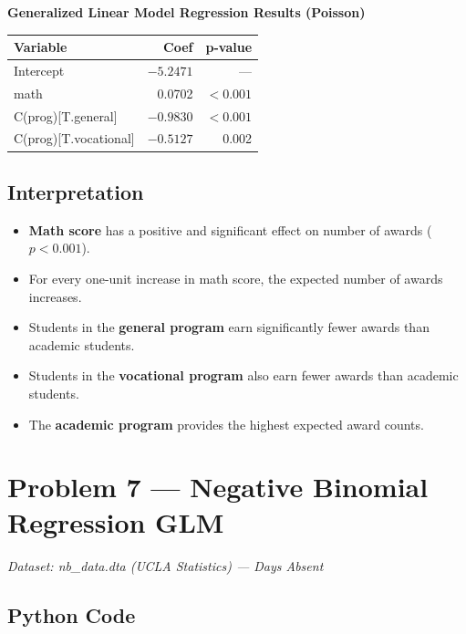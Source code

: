 \documentclass[12pt,a4paper]{article}
\begin{document}
\begin{outputbox}
\textbf{Generalized Linear Model Regression Results (Poisson)}
\begin{center}
\begin{tabular}{lrr}
\toprule
Variable                & Coef    & p-value  \\
\midrule
Intercept               & $-5.2471$ & ---    \\
math                    & 0.0702  & $<0.001$ \\
C(prog)[T.general]      & $-0.9830$ & $<0.001$ \\
C(prog)[T.vocational]   & $-0.5127$ & 0.002  \\
\bottomrule
\end{tabular}
\end{center}
\end{outputbox}

\subsection{Interpretation}

\begin{interpbox}
\begin{itemize}[noitemsep]
  \item \textbf{Math score} has a positive and significant effect on number of awards ($p < 0.001$).
  \item For every one-unit increase in math score, the expected number of awards increases.
  \item Students in the \textbf{general program} earn significantly fewer awards than academic students.
  \item Students in the \textbf{vocational program} also earn fewer awards than academic students.
  \item The \textbf{academic program} provides the highest expected award counts.
\end{itemize}
\end{interpbox}

\newpage
\section{Problem 7 — Negative Binomial Regression GLM}

\textit{Dataset: nb\_data.dta (UCLA Statistics) — Days Absent}

\subsection{Python Code}
\end{document}
